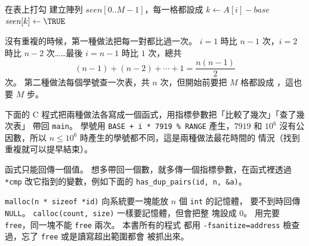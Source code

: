 \begin{pseudo}[label=alg:dup-marks]{在表上打勾}
    \State 建立陣列 $\mathit{seen}[0..M-1]$，每一格都設成 \FALSE
        \State $k \gets A[i] - \mathit{base}$
            \State \Return \TRUE
        \EndIf
        \State $\mathit{seen}[k] \gets \TRUE$
    \EndFor
    \State \Return \FALSE
\EndFunction
\end{pseudo}

沒有重複的時候，第一種做法把每一對都比過一次。 $i = 1$ 時比 $n - 1$ 次，$i = 2$
時比 $n - 2$ 次……最後 $i = n - 1$ 時比 $1$ 次，總共
\[
(n - 1) + (n - 2) + \cdots + 1 = \frac{n(n-1)}{2}
\]
次。 第二種做法每個學號查一次表，共 $n$ 次，但開始前要把 $M$ 格都設成
\FALSE，這也要 $M$ 步。

下面的 C 程式把兩種做法各寫成一個函式，用指標參數把「比較了幾次」「查了幾次表」
帶回 \texttt{main}。 學號用 \texttt{BASE + i * 7919 \% RANGE} 產生，$7919$ 和
$10^6$ 沒有公因數，所以 $n \le 10^6$ 時產生的學號都不同，這是兩種做法最花時間的
情況（找到重複就可以提早結束）。

\begin{cbookrecap}[第~9~章 9.2 節、第~19~章 19.3 節]
函式只能回傳一個值。 想多帶回一個數，就多傳一個指標參數，在函式裡透過
\texttt{*cmp} 改它指到的變數，例如下面的 \texttt{has\_dup\_pairs(id, n, \&a)}。

\texttt{malloc(n * sizeof *id)} 向系統要一塊能放 $n$ 個 \texttt{int} 的記憶體，
要不到時回傳 \texttt{NULL}。 \texttt{calloc(count, size)} 一樣要記憶體，但會把整
塊設成 $0$。 用完要 \texttt{free}，同一塊不能 \texttt{free} 兩次。 本書所有的程式
都用 \texttt{-fsanitize=address} 檢查過，忘了 \texttt{free} 或是讀寫超出範圍都會
被抓出來。
\end{cbookrecap}

